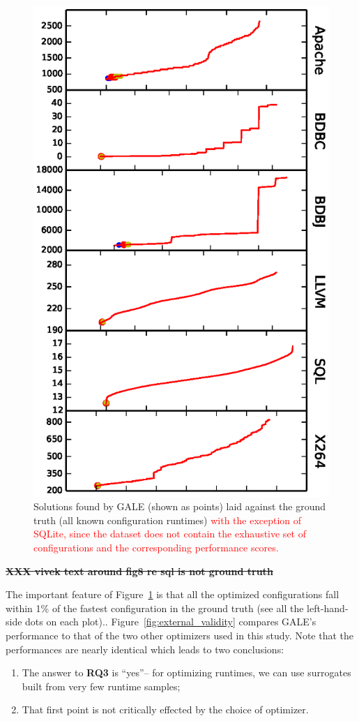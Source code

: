 \documentclass{sig-alternative}
\newcommand{\be}{\begin{enumerate}}
\newcommand{\ee}{\end{enumerate}}
\newcommand{\fig}[1]{Figure~\ref{fig:#1}}
\begin{document}
\begin{figure}[!t]
\includegraphics[width=0.9\linewidth]{Figures/optimizer_result.eps}
\caption{Solutions found by GALE (shown as points) laid against the ground truth (all known configuration runtimes) \textcolor{red}{with the exception of SQLite, since the dataset does not contain the exhaustive set of configurations and the corresponding performance scores.}}\label{fig:performance_graph}
\end{figure}

\st{\bf XXX vivek text around fig8 re sql is not ground truth}

The important feature of \fig{performance_graph} is that all the optimized configurations fall within 1\% of the fastest
configuration in the ground truth (see all the left-hand-side dots on each plot).. \fig{external_validity} compares GALE's performance to that of the two other optimizers
used in this study. Note that the performances are nearly identical which leads to two conclusions:
\be
\item The answer to {\bf RQ3} is ``yes''-- for optimizing runtimes, we can use surrogates built from very few runtime samples;
\item That first point is not critically effected by the choice of optimizer.  
\ee
\end{document}
